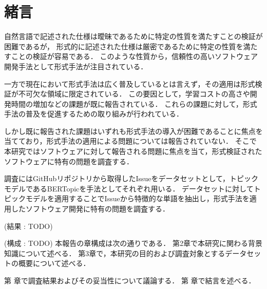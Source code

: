 \documentclass[main]{subfiles}
\begin{document}
\chapter{緒言}




自然言語で記述された仕様は曖昧であるために特定の性質を満たすことの検証が困難であるが，
形式的に記述された仕様は厳密であるために特定の性質を満たすことの検証が容易である．
このような性質から，信頼性の高いソフトウェア開発手法として形式手法が注目されている\cite{aoki:2018}．

一方で現在において形式手法は広く普及しているとは言えず，その適用は形式検証が不可欠な領域に限定されている．
この要因として，学習コストの高さや開発時間の増加などの課題が既に報告されている\cite{reid:2020}．
これらの課題に対して，形式手法の普及を促進するための取り組みが行われている\cite{huisman:2020,ohnishi:2020}．

しかし既に報告された課題はいずれも形式手法の導入が困難であることに焦点を当てており，形式手法の適用による問題については報告されていない．
そこで本研究ではソフトウェアに対して報告される問題に焦点を当て，形式検証されたソフトウェアに特有の問題を調査する．

調査にはGitHubリポジトリから取得したIssueをデータセットとして，トピックモデルであるBERTopic\cite{grootendorst:2022}を手法としてそれぞれ用いる．
データセットに対してトピックモデルを適用することでIssueから特徴的な単語を抽出し，形式手法を適用したソフトウェア開発に特有の問題を調査する．

(結果 : TODO)

(構成 : TODO)
本報告の章構成は次の通りである．
第2章で本研究に関わる背景知識について述べる．
第3章で，本研究の目的および調査対象とするデータセットの概要について述べる．

第 章で調査結果およびその妥当性について議論する．
第 章で結言を述べる．
\end{document}
